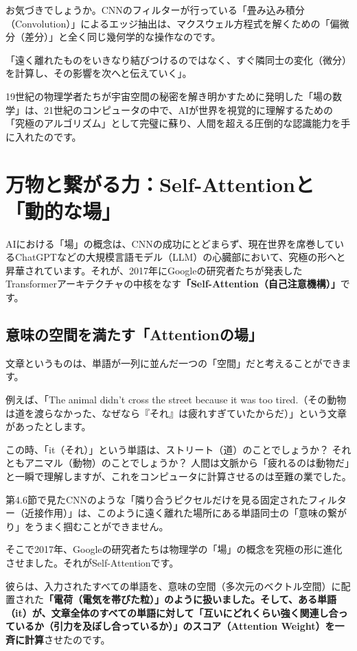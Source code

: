 お気づきでしょうか。CNNのフィルターが行っている「畳み込み積分（Convolution）」によるエッジ抽出は、マクスウェル方程式を解くための「偏微分（差分）」と全く同じ幾何学的な操作なのです。

「遠く離れたものをいきなり結びつけるのではなく、すぐ隣同士の変化（微分）を計算し、その影響を次へと伝えていく」。

19世紀の物理学者たちが宇宙空間の秘密を解き明かすために発明した「場の数学」は、21世紀のコンピュータの中で、AIが世界を視覚的に理解するための「究極のアルゴリズム」として完璧に蘇り、人間を超える圧倒的な認識能力を手に入れたのです。

\section{万物と繋がる力：Self-Attentionと「動的な場」}

AIにおける「場」の概念は、CNNの成功にとどまらず、現在世界を席巻しているChatGPTなどの大規模言語モデル（LLM）の心臓部において、究極の形へと昇華されています。それが、2017年にGoogleの研究者たちが発表したTransformerアーキテクチャの中核をなす\textbf{「Self-Attention（自己注意機構）」}です。

\subsection{意味の空間を満たす「Attentionの場」}

文章というものは、単語が一列に並んだ一つの「空間」だと考えることができます。

例えば、「The animal didn't cross the street because it was too tired.（その動物は道を渡らなかった、なぜなら『それ』は疲れすぎていたからだ）」という文章があったとします。

この時、「it（それ）」という単語は、ストリート（道）のことでしょうか？ それともアニマル（動物）のことでしょうか？ 人間は文脈から「疲れるのは動物だ」と一瞬で理解しますが、これをコンピュータに計算させるのは至難の業でした。

第4.6節で見たCNNのような「隣り合うピクセルだけを見る固定されたフィルター（近接作用）」は、このように遠く離れた場所にある単語同士の「意味の繋がり」をうまく掴むことができません。

そこで2017年、Googleの研究者たちは物理学の「場」の概念を究極の形に進化させました。それがSelf-Attentionです。

彼らは、入力されたすべての単語を、意味の空間（多次元のベクトル空間）に配置された\textbf{「電荷（電気を帯びた粒）」のように扱いました。そして、ある単語（it）が、文章全体のすべての単語に対して「互いにどれくらい強く関連し合っているか（引力を及ぼし合っているか）」のスコア（Attention Weight）を一斉に計算}させたのです。

